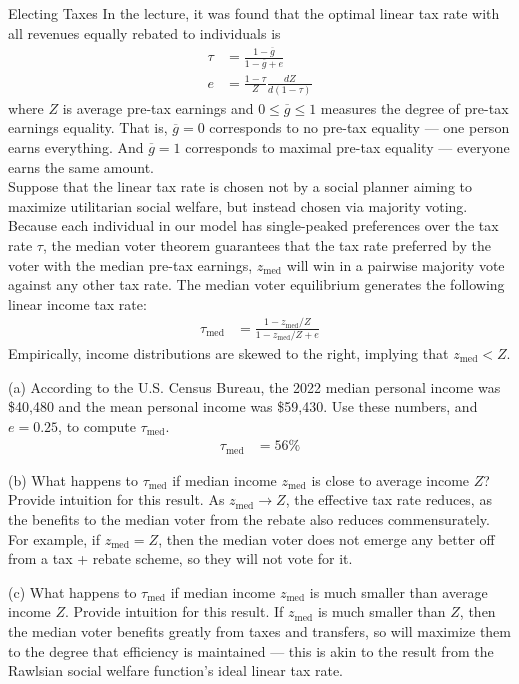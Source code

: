 \documentclass[10pt]{extarticle}
\begin{document}
  \begin{problem}{Electing Taxes}
    In the lecture, it was found that the optimal linear tax rate with all revenues equally rebated to individuals is
    \begin{align*}
      \tau &= \frac{1-\overline{g}}{1-\overline{g} + e}\\
      e &= \frac{1-\tau}{Z}\frac{dZ}{d(1-\tau)}
    \end{align*}
    where $Z$ is average pre-tax earnings and $0\leq \overline{g} \leq 1$ measures the degree of pre-tax earnings equality. That is, $\overline{g} = 0$ corresponds to no pre-tax equality --- one person earns everything. And $\overline{g} = 1$ corresponds to maximal pre-tax equality --- everyone earns the same amount.\\

    Suppose that the linear tax rate is chosen not by a social planner aiming to maximize utilitarian social welfare, but instead chosen via majority voting. Because each individual in our model has single-peaked preferences over the tax rate $\tau$, the median voter theorem guarantees that the tax rate preferred by the voter with the median pre-tax earnings, $z_{\text{med}}$ will win in a pairwise majority vote against any other tax rate. The median voter equilibrium generates the following linear income tax rate:
    \begin{align*}
      \tau_{\text{med}} &= \frac{1-z_{\text{med}}/Z}{1-z_{\text{med}}/Z + e}
    \end{align*}
    Empirically, income distributions are skewed to the right, implying that $z_{\text{med}}< Z$.
    \tcblower
    \begin{problem}{(a)}
      According to the U.S. Census Bureau, the 2022 median personal income was \$40,480 and the mean personal income was \$59,430. Use these numbers, and $e = 0.25$, to compute $\tau_{\text{med}}$.
      \tcblower
      \begin{align*}
        \tau_{\text{med}} &= 56\%
      \end{align*}
    \end{problem}
    \begin{problem}{(b)}
      What happens to $\tau_{\text{med}}$ if median income $z_{\text{med}}$ is close to average income $Z$? Provide intuition for this result.
      \tcblower
      As $z_{\text{med}} \rightarrow Z$, the effective tax rate reduces, as the benefits to the median voter from the rebate also reduces commensurately. For example, if $z_{\text{med}} = Z$, then the median voter does not emerge any better off from a tax + rebate scheme, so they will not vote for it.
    \end{problem}
    \begin{problem}{(c)}
      What happens to $\tau_{\text{med}}$ if median income $z_{\text{med}}$ is much smaller than average income $Z$. Provide intuition for this result.
      \tcblower
      If $z_{\text{med}}$ is much smaller than $Z$, then the median voter benefits greatly from taxes and transfers, so will maximize them to the degree that efficiency is maintained --- this is akin to the result from the Rawlsian social welfare function's ideal linear tax rate.
    \end{problem}
  \end{problem}
\end{document}
